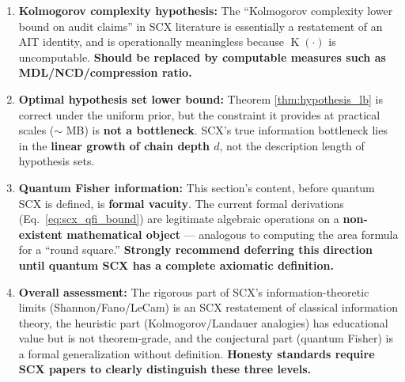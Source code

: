 \documentclass[12pt,a4paper]{article}
\theoremstyle{plain}
\theoremstyle{definition}
\DeclareMathOperator{\Kolm}{K}
\begin{document}
\begin{honestbox}[title={Honest Critique Summary}]
\begin{enumerate}[leftmargin=*]
    \item \textbf{Kolmogorov complexity hypothesis:}
    The ``Kolmogorov complexity lower bound on audit claims'' in SCX literature is essentially a restatement of an AIT identity,
    and is operationally meaningless because $\Kolm(\cdot)$ is uncomputable.
    \textbf{Should be replaced by computable measures such as MDL/NCD/compression ratio.}

    \item \textbf{Optimal hypothesis set lower bound:}
    Theorem \ref{thm:hypothesis_lb} is correct under the uniform prior,
    but the constraint it provides at practical scales ($\sim$ MB) is \textbf{not a bottleneck}.
    SCX's true information bottleneck lies in the \textbf{linear growth of chain depth $d$}, not the description length of hypothesis sets.

    \item \textbf{Quantum Fisher information:}
    This section's content, before quantum SCX is defined, is \textbf{formal vacuity}.
    The current formal derivations (Eq.~\ref{eq:scx_qfi_bound}) are legitimate algebraic operations on a \textbf{non-existent mathematical object}
    --- analogous to computing the area formula for a ``round square.''
    \textbf{Strongly recommend deferring this direction until quantum SCX has a complete axiomatic definition.}

    \item \textbf{Overall assessment:}
    The rigorous part of SCX's information-theoretic limits (Shannon/Fano/LeCam) is an SCX restatement of classical information theory,
    the heuristic part (Kolmogorov/Landauer analogies) has educational value but is not theorem-grade,
    and the conjectural part (quantum Fisher) is a formal generalization without definition.
    \textbf{Honesty standards require SCX papers to clearly distinguish these three levels.}
\end{enumerate}
\end{honestbox}
\end{document}
